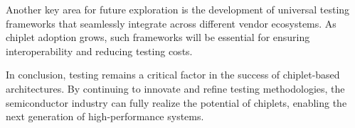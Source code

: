 \documentclass[acmtog, 12pt]{acmart}
\begin{document}
Another key area for future exploration is the development of universal testing frameworks that seamlessly integrate across different vendor ecosystems. As chiplet adoption grows, such frameworks will be essential for ensuring interoperability and reducing testing costs.

In conclusion, testing remains a critical factor in the success of chiplet-based architectures. By continuing to innovate and refine testing methodologies, the semiconductor industry can fully realize the potential of chiplets, enabling the next generation of high-performance systems.





\end{document}
